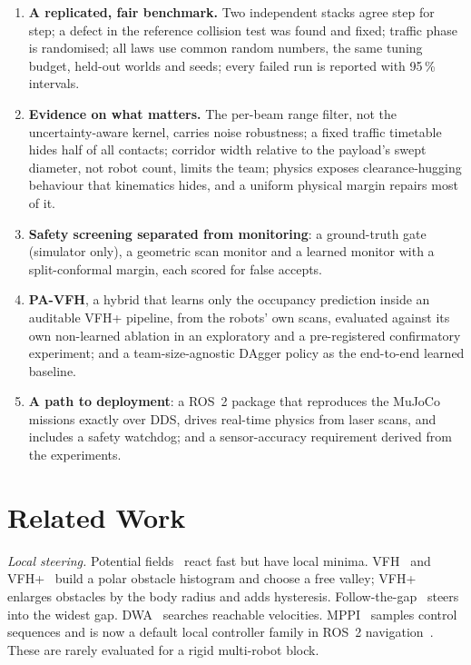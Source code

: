 \documentclass[journal]{IEEEtran}
\newcommand{\pavfh}{PA-VFH}
\begin{document}
\begin{enumerate}
\item \textbf{A replicated, fair benchmark.} Two independent stacks agree
step for step; a defect in the reference collision test was found and fixed;
traffic phase is randomised; all laws use common random numbers, the same
tuning budget, held-out worlds and seeds; every failed run is reported with
95\,\% intervals.
\item \textbf{Evidence on what matters.} The per-beam range filter, not the
uncertainty-aware kernel, carries noise robustness; a fixed traffic timetable
hides half of all contacts; corridor width relative to the payload's swept
diameter, not robot count, limits the team; physics exposes clearance-hugging
behaviour that kinematics hides, and a uniform physical margin repairs most of it.
\item \textbf{Safety screening separated from monitoring}: a ground-truth
gate (simulator only), a geometric scan monitor and a learned monitor with a
split-conformal margin, each scored for false accepts.
\item \textbf{\pavfh{}}, a hybrid that learns only the occupancy prediction
inside an auditable VFH+ pipeline, from the robots' own scans, evaluated against
its own non-learned ablation in an exploratory and a pre-registered confirmatory
experiment; and a team-size-agnostic DAgger policy as the
end-to-end learned baseline.
\item \textbf{A path to deployment}: a ROS~2 package that reproduces the
MuJoCo missions exactly over DDS, drives real-time physics from laser scans,
and includes a safety watchdog; and a sensor-accuracy requirement derived from
the experiments.
\end{enumerate}

\section{Related Work}
\textit{Local steering.} Potential fields~\cite{khatib1986} react fast but
have local minima. VFH~\cite{borenstein1991} and VFH+~\cite{ulrich1998} build
a polar obstacle histogram and choose a free valley; VFH+ enlarges obstacles by
the body radius and adds hysteresis. Follow-the-gap~\cite{sezer2012} steers
into the widest gap. DWA~\cite{fox1997} searches reachable velocities.
MPPI~\cite{williams2016,williams2018} samples control sequences and is now a
default local controller family in ROS~2 navigation~\cite{macenski2020}.
These are rarely evaluated for a rigid multi-robot block.
\end{document}
